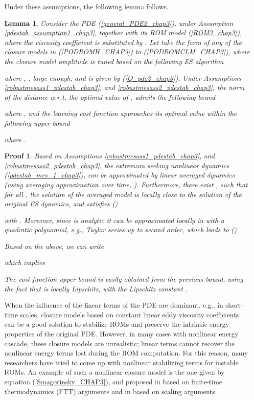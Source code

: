 \documentclass[letterpaper,conference,onecolumn,11pt]{IEEEtran}
\newtheorem{lemma}{Lemma}
\newtheorem{pf}{Proof}
\begin{document}
Under these assumptions, the following lemma follows.
\begin{lemma}\label{pdestab_lemma1_chap3}
Consider the PDE (\ref{general_PDE2_chap3}), under Assumption
\ref{pdestab_assumption1_chap3}, together with its ROM model
(\ref{ROM3_chap3}), where the viscosity coefficient  is
substituted by . Let  take the form of any of
the closure models in (\ref{PODROMH_CHAP3}) to
(\ref{PODROMCLM_CHAP3}), where the closure model amplitude
 is tuned based on the following ES algorithm

where , ,  large enough,
and  is given by (\ref{Q_pde2_chap3}). Under Assumptions
\ref{robustmesass1_pdestab_chap3}, and
\ref{robustmesass2_pdestab_chap3}, the norm of the distance w.r.t.
the optimal value of ,
  admits the following bound

where , and the learning cost function approaches
its optimal value within the following upper-bound\

where .
\end{lemma}
\begin{pf}
Based on Assumptions \ref{robustmesass1_pdestab_chap3}, and
\ref{robustmesass2_pdestab_chap3}, the extremum seeking nonlinear
dynamics (\ref{pdestab_mes_1_chap3}), can be approximated by
linear averaged dynamics (using averaging approximation over time,
\cite[p. 435, Definition 1]{Rote00}). Furthermore, there exist , such that for all , the
solution of the averaged model  is locally
close to the solution of the original ES dynamics, and satisfies
(\cite[p. 436]{Rote00})

with . Moreover, since  is
analytic it can be approximated locally in 
with a quadratic polynomial, e.g., Taylor series up to second
order, which leads to (\cite[p. 437]{Rote00})

Based on the above, we can write

which implies

The cost function upper-bound is easily obtained from the previous
bound, using the fact that  is locally Lipschitz, with the
Lipschitz constant
.
 \hspace{+9cm}
\end{pf}

When the influence of the linear terms of the PDE are dominant, e.g.,
in short-time scales, closure models based on constant linear eddy
viscosity coefficients can be a good solution to stabilize ROMs and
preserve the intrinsic energy properties of the original PDE. However,
in many cases with nonlinear energy cascade, these closure models are
unrealistic; linear terms cannot recover the nonlinear energy terms
lost during the ROM computation. For this reason, many researchers
have tried to come up with nonlinear stabilizing terms for instable
ROMs. An example of such a nonlinear closure model is the one given by
equation (\ref{Smagorinsky_CHAP3}), and proposed in \cite{NETAL08}
based on finite-time thermodynamics (FTT) arguments and in
\cite{NMT011} based on scaling arguments.
\end{document}
